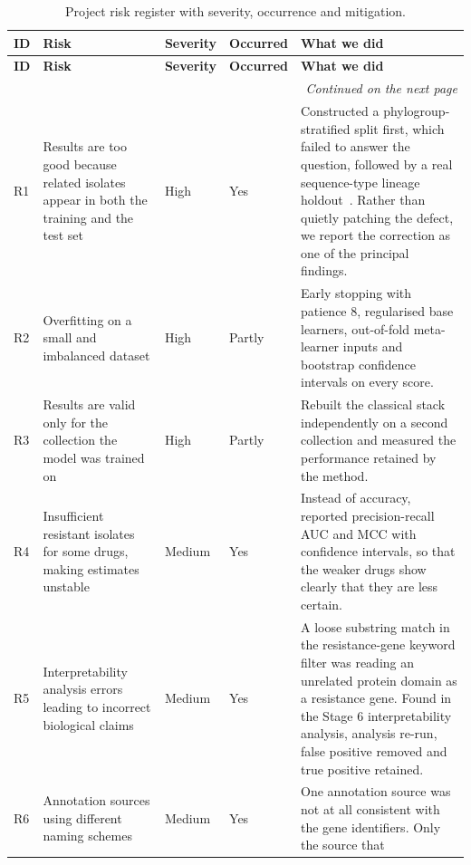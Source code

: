 {\small\setlength{\tabcolsep}{5pt}
\begin{longtable}{|l|>{\raggedright\arraybackslash}p{4.3cm}|>{\raggedright\arraybackslash}p{1.5cm}|>{\raggedright\arraybackslash}p{1.4cm}|>{\raggedright\arraybackslash}p{5.0cm}|}
\caption{Project risk register with severity, occurrence and mitigation.}
\label{tab:risks}\\
\hline
\textbf{ID} & \textbf{Risk} & \textbf{Severity} & \textbf{Occurred} & \textbf{What we did} \\
\hline
\endfirsthead
\hline
\textbf{ID} & \textbf{Risk} & \textbf{Severity} & \textbf{Occurred} & \textbf{What we did} \\
\hline
\endhead
\hline
\multicolumn{5}{r}{\footnotesize\textit{Continued on the next page}}\\
\endfoot
\hline
\endlastfoot
R1 & Results are too good because related isolates appear in both the training and the test
set &
High & Yes &
Constructed a phylogroup-stratified split first, which failed to answer the question, followed
by a real sequence-type lineage holdout~\cite{Yu2025}. Rather than quietly patching the defect,
we report the correction as one of the principal findings. \\
\hline
R2 & Overfitting on a small and imbalanced dataset & High & Partly &
Early stopping with patience 8, regularised base learners, out-of-fold meta-learner inputs and
bootstrap confidence intervals on every score. \\
\hline
R3 & Results are valid only for the collection the model was trained on & High & Partly &
Rebuilt the classical stack independently on a second collection and measured the performance
retained by the method. \\
\hline
R4 & Insufficient resistant isolates for some drugs, making estimates unstable &
Medium & Yes &
Instead of accuracy, reported precision-recall AUC and MCC with confidence intervals, so that
the weaker drugs show clearly that they are less certain. \\
\hline
R5 & Interpretability analysis errors leading to incorrect biological claims & Medium & Yes &
A loose substring match in the resistance-gene keyword filter was reading an unrelated protein
domain as a resistance gene. Found in the Stage 6 interpretability analysis, analysis re-run,
false positive removed and true positive retained. \\
\hline
R6 & Annotation sources using different naming schemes & Medium & Yes &
One annotation source was not at all consistent with the gene identifiers. Only the source that

\end{longtable}}
